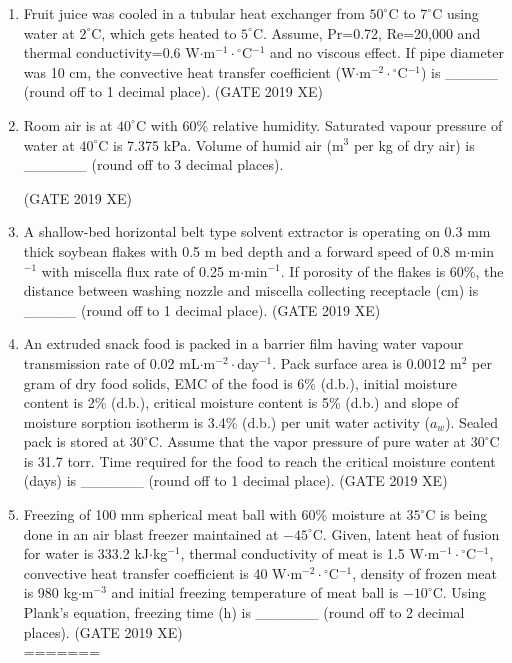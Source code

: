 \documentclass[journal,12pt,onecolumn]{IEEEtran}
\begin{document}
\begin{enumerate}
\item Fruit juice was cooled in a tubular heat exchanger from $50^\circ$C to $7^\circ$C using water at $2^\circ$C, which gets heated to $5^\circ$C. Assume, Pr=0.72, Re=20,000 and thermal conductivity=0.6 W$\cdot$m$^{-1}\cdot{}^\circ$C$^{-1}$ and no viscous effect. If pipe diameter was 10 cm, the convective heat transfer coefficient (W$\cdot$m$^{-2}\cdot{}^\circ$C$^{-1}$) is \_\_\_\_\_ (round off to 1 decimal place).
\hfill{(GATE 2019 XE)} \\


\item Room air is at $40^\circ$C with 60\% relative humidity. Saturated vapour pressure of water at $40^\circ$C is 7.375 kPa. Volume of humid air (m$^{3}$ per kg of dry air) is \_\_\_\_\_\_ (round off to 3 decimal places).

\hfill{(GATE 2019 XE)} \\

\item A shallow-bed horizontal belt type solvent extractor is operating on 0.3 mm thick soybean flakes with 0.5 m bed depth and a forward speed of 0.8 m$\cdot$min$^{-1}$ with miscella flux rate of 0.25 m$\cdot$min$^{-1}$. If porosity of the flakes is 60\%, the distance between washing nozzle and miscella collecting receptacle (cm) is \_\_\_\_\_ (round off to 1 decimal place).
\hfill{(GATE 2019 XE)} \\


\item An extruded snack food is packed in a barrier film having water vapour transmission rate of 0.02 mL$\cdot$m$^{-2}\cdot$day$^{-1}$. Pack surface area is 0.0012 m$^{2}$ per gram of dry food solids, EMC of the food is 6\% (d.b.), initial moisture content is 2\% (d.b.), critical moisture content is 5\% (d.b.) and slope of moisture sorption isotherm is 3.4\% (d.b.) per unit water activity ($a_w$). Sealed pack is stored at $30^\circ$C. Assume that the vapor pressure of pure water at $30^\circ$C is 31.7 torr. Time required for the food to reach the critical moisture content (days) is \_\_\_\_\_\_ (round off to 1 decimal place).
\hfill{(GATE 2019 XE)} \\


\item Freezing of 100 mm spherical meat ball with 60\% moisture at $35^\circ$C is being done in an air blast freezer maintained at $-45^\circ$C. Given, latent heat of fusion for water is 333.2 kJ$\cdot$kg$^{-1}$, thermal conductivity of meat is 1.5 W$\cdot$m$^{-1}\cdot{}^\circ$C$^{-1}$, convective heat transfer coefficient is 40 W$\cdot$m$^{-2}\cdot{}^\circ$C$^{-1}$, density of frozen meat is 980 kg$\cdot$m$^{-3}$ and initial freezing temperature of meat ball is $-10^\circ$C. Using Plank's equation, freezing time (h) is \_\_\_\_\_\_ (round off to 2 decimal places).
\hfill{(GATE 2019 XE)} \\
=======


\end{enumerate}
\end{document}
